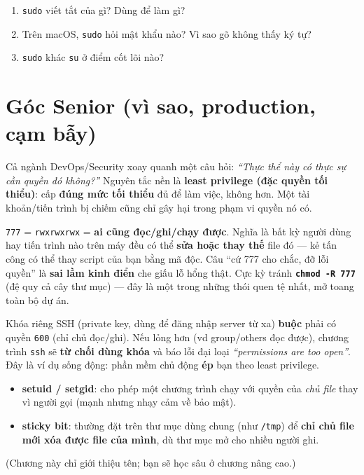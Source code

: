 \documentclass[12pt,a4paper]{article}
\newcommand{\cmd}[1]{\texttt{#1}}
\begin{document}
\begin{checkbox}
\begin{enumerate}
\item \cmd{sudo} viết tắt của gì? Dùng để làm gì?
\item Trên macOS, \cmd{sudo} hỏi mật khẩu nào? Vì sao gõ không thấy ký tự?
\item \cmd{sudo} khác \cmd{su} ở điểm cốt lõi nào?
\end{enumerate}
\end{checkbox}

\section{Góc Senior (vì sao, production, cạm bẫy)}

\begin{seniorbox}
Cả ngành DevOps/Security xoay quanh một câu hỏi: \textit{``Thực thể này có thực sự
cần quyền đó không?''} Nguyên tắc nền là \textbf{least privilege (đặc quyền tối
thiểu)}: cấp \textbf{đúng mức tối thiểu} đủ để làm việc, không hơn. Một tài
khoản/tiến trình bị chiếm cũng chỉ gây hại trong phạm vi quyền nó có.
\end{seniorbox}

\begin{seniorbox}
\cmd{777} = \cmd{rwxrwxrwx} = \textbf{ai cũng đọc/ghi/chạy được}. Nghĩa là bất kỳ
người dùng hay tiến trình nào trên máy đều có thể \textbf{sửa hoặc thay thế} file đó
--- kẻ tấn công có thể thay script của bạn bằng mã độc. Câu ``cứ 777 cho chắc, đỡ lỗi
quyền'' là \textbf{sai lầm kinh điển} che giấu lỗ hổng thật. Cực kỳ tránh
\textbf{\cmd{chmod -R 777}} (đệ quy cả cây thư mục) --- đây là một trong những thói
quen tệ nhất, mở toang toàn bộ dự án.
\end{seniorbox}

\begin{seniorbox}
Khóa riêng SSH (private key, dùng để đăng nhập server từ xa) \textbf{buộc} phải có
quyền \cmd{600} (chỉ chủ đọc/ghi). Nếu lỏng hơn (vd group/others đọc được), chương
trình \cmd{ssh} sẽ \textbf{từ chối dùng khóa} và báo lỗi đại loại \textit{``permissions
are too open''}. Đây là ví dụ sống động: phần mềm chủ động \textbf{ép} bạn theo least
privilege.
\end{seniorbox}

\begin{seniorbox}
\begin{itemize}
\item \textbf{setuid / setgid}: cho phép một chương trình chạy với quyền của
  \textit{chủ file} thay vì người gọi (mạnh nhưng nhạy cảm về bảo mật).
\item \textbf{sticky bit}: thường đặt trên thư mục dùng chung (như \cmd{/tmp}) để
  \textbf{chỉ chủ file mới xóa được file của mình}, dù thư mục mở cho nhiều người
  ghi.
\end{itemize}
(Chương này chỉ giới thiệu tên; bạn sẽ học sâu ở chương nâng cao.)
\end{seniorbox}
\end{document}
